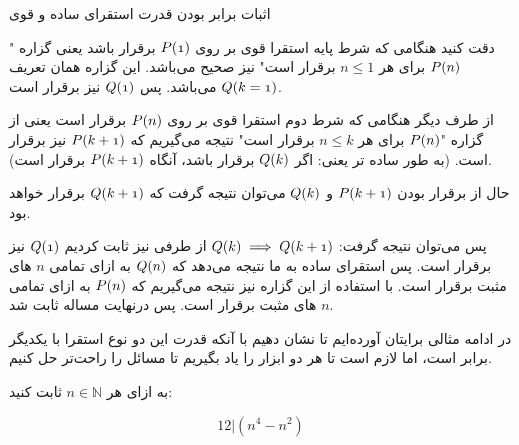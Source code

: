 \begin{EXTRA}{اثبات برابر بودن قدرت استقرای ساده و قوی}
\begin{enumerate}
                دقت کنید هنگامی که شرط پایه استقرا قوی بر روی
                $\mathnormal{P(1)}$ 
                برقرار باشد یعنی گزاره
                "$\mathnormal{P(n)}$
                برای هر
                $n \leq 1$
                برقرار است" نیز صحیح می‌باشد.
                این گزاره همان تعریف
                $\mathnormal{Q(k = 1)}$
                می‌باشد.
                پس
                $\mathnormal{Q(1)}$
                نیز برقرار است.


                از طرف دیگر هنگامی که شرط دوم استقرا قوی بر روی
                $\mathnormal{P(n)}$ 
                برقرار است یعنی از گزاره
                "$\mathnormal{P(n)}$
                برای هر
                $n \leq k$
                برقرار است" نتیجه می‌گیریم که
                $\mathnormal{P(k + 1)}$
                نیز برقرار است.
                (به طور ساده تر یعنی: اگر
                $\mathnormal{Q(k)}$
                برقرار باشد، آنگاه
                $\mathnormal{P(k + 1)}$
                برقرار است).
                
                حال از برقرار بودن
                $\mathnormal{P(k + 1)}$
                و 
                $\mathnormal{Q(k)}$
                می‌توان نتیجه گرفت که
                $\mathnormal{Q(k + 1)}$
                برقرار خواهد بود.

                پس می‌توان نتیجه گرفت:
                $\mathnormal{Q(k)} \implies \mathnormal{Q(k + 1)}$
                از طرفی نیز ثابت کردیم
                $\mathnormal{Q(1)}$
                نیز برقرار است.
                پس استقرای ساده به ما نتیجه می‌دهد که
                $\mathnormal{Q(n)}$
                به ازای تمامی
                $n$
                های مثبت برقرار است. با استفاده از این گزاره نیز نتیجه می‌گیریم که
                $\mathnormal{P(n)}$
                به ازای تمامی
                $n$
                های مثبت برقرار است.
                پس درنهایت مساله ثابت شد.
                
            \end{enumerate} 
        
    \end{EXTRA}

    در ادامه مثالی برایتان آورده‌ایم تا نشان دهیم با آنکه قدرت این دو نوع استقرا با یکدیگر برابر است،
    اما لازم است تا هر دو ابزار را یاد بگیریم تا مسائل را راحت‌تر حل کنیم.

\begin{PROBLEM}[]
    به ازای هر
    $n \in \mathbb{N}$
    ثابت کنید:

    $$12 | (n^4 - n^2)$$

\end{PROBLEM}


